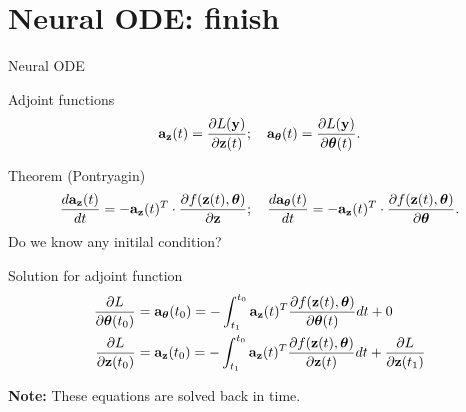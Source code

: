 \section{Neural ODE: finish}
\begin{frame}{Neural ODE}
	\begin{block}{Adjoint functions}
		\vspace{-0.3cm}
		\[
			\mathbf{a}_{\mathbf{z}}(t) = \frac{\partial L(\mathbf{y})}{\partial \mathbf{z}(t)}; \quad \mathbf{a}_{\boldsymbol{\theta}}(t) = \frac{\partial L(\mathbf{y})}{\partial \boldsymbol{\theta}(t)}.
		\]
		\vspace{-0.6cm}
	\end{block}
	\begin{block}{Theorem (Pontryagin)}
	\vspace{-0.6cm}
	\[
	     \frac{d \mathbf{a}_{\mathbf{z}}(t)}{dt} = - \mathbf{a}_{\mathbf{z}}(t)^T \cdot \frac{\partial f(\mathbf{z}(t), \boldsymbol{\theta})}{\partial \mathbf{z}}; \quad \frac{d \mathbf{a}_{\boldsymbol{\theta}}(t)}{dt} = - \mathbf{a}_{\mathbf{z}}(t)^T \cdot \frac{\partial f(\mathbf{z}(t), \boldsymbol{\theta})}{\partial \boldsymbol{\theta}}.
	\]
	Do we know any initilal condition?
	\end{block}
	\begin{block}{Solution for adjoint function}
		\vspace{-0.8cm}
		\begin{align*}
			 \frac{\partial L}{\partial \boldsymbol{\theta}(t_0)} &= \mathbf{a}_{\boldsymbol{\theta}}(t_0) =  - \int_{t_1}^{t_0} \mathbf{a}_{\mathbf{z}}(t)^T \frac{\partial f(\mathbf{z}(t), \boldsymbol{\theta})}{\partial \boldsymbol{\theta}(t)} dt + 0\\
			 \frac{\partial L}{\partial \mathbf{z}(t_0)} &= \mathbf{a}_{\mathbf{z}}(t_0) =  - \int_{t_1}^{t_0} \mathbf{a}_{\mathbf{z}}(t)^T \frac{\partial f(\mathbf{z}(t), \boldsymbol{\theta})}{\partial \mathbf{z}(t)} dt + \frac{\partial L}{\partial \mathbf{z}(t_1)}\\
		\end{align*}
		\vspace{-1.5cm}
	\end{block}
	\textbf{Note:} These equations are solved back in time.
\end{frame}
